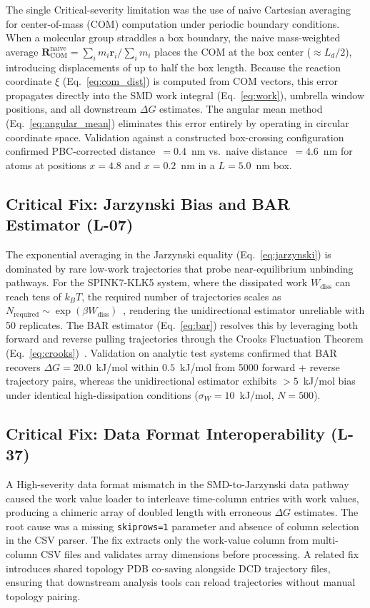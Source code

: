 \documentclass[conference]{IEEEtran}
\begin{document}
The single Critical-severity limitation was the use of naive Cartesian
averaging for center-of-mass (COM) computation under periodic boundary
conditions.  When a molecular group straddles a box boundary, the naive
mass-weighted average $\mathbf{R}_{\mathrm{COM}}^{\mathrm{naive}} =
\sum_i m_i \mathbf{r}_i / \sum_i m_i$ places the COM at the box center
($\approx L_d/2$), introducing displacements of up to half the box length.
Because the reaction coordinate $\xi$ (Eq.~\ref{eq:com_dist}) is computed
from COM vectors, this error propagates directly into the SMD work
integral (Eq.~\ref{eq:work}), umbrella window positions, and all downstream
$\Delta G$ estimates.  The angular mean method (Eq.~\ref{eq:angular_mean})
eliminates this error entirely by operating in circular coordinate space.
Validation against a constructed box-crossing configuration confirmed
PBC-corrected distance~$= 0.4$~nm vs.\ naive distance~$= 4.6$~nm for
atoms at positions $x = 4.8$ and $x = 0.2$~nm in a $L = 5.0$~nm box.

\subsection{Critical Fix: Jarzynski Bias and BAR Estimator (L-07)}

The exponential averaging in the Jarzynski equality
(Eq.~\ref{eq:jarzynski}) is dominated by rare low-work trajectories that
probe near-equilibrium unbinding pathways.  For the SPINK7-KLK5 system,
where the dissipated work $W_{\mathrm{diss}}$ can reach tens of $k_BT$,
the required number of trajectories scales as
$N_{\mathrm{required}} \sim \exp(\beta W_{\mathrm{diss}})$~\cite{zuckerman2002},
rendering the unidirectional estimator unreliable with 50 replicates.
The BAR estimator (Eq.~\ref{eq:bar}) resolves this by leveraging both
forward and reverse pulling trajectories through the Crooks Fluctuation
Theorem (Eq.~\ref{eq:crooks})~\cite{crooks1999,bennett1976}.  Validation
on analytic test systems confirmed that BAR recovers $\Delta G = 20.0$~kJ/mol
within $0.5$~kJ/mol from 5000 forward + reverse trajectory pairs, whereas
the unidirectional estimator exhibits $> 5$~kJ/mol bias under identical
high-dissipation conditions ($\sigma_W = 10$~kJ/mol, $N = 500$).

\subsection{Critical Fix: Data Format Interoperability (L-37)}

A High-severity data format mismatch in the SMD-to-Jarzynski data pathway
caused the work value loader to interleave time-column entries with
work values, producing a chimeric array of doubled length with erroneous
$\Delta G$ estimates.  The root cause was a missing \texttt{skiprows=1}
parameter and absence of column selection in the CSV parser.  The fix
extracts only the work-value column from multi-column CSV files and
validates array dimensions before processing.  A related fix introduces
shared topology PDB co-saving alongside DCD trajectory files, ensuring
that downstream analysis tools can reload trajectories without manual
topology pairing.
\end{document}
